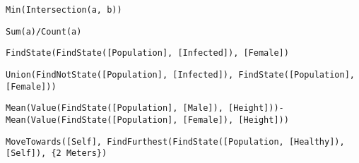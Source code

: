 \documentclass[]{memoir}
\begin{document}

\lstinline!Min(Intersection(a, b))!


\lstinline!Sum(a)/Count(a)!


\lstinline!FindState(FindState([Population], [Infected]), [Female])!


\lstinline!Union(FindNotState([Population], [Infected]), FindState([Population], [Female]))!


\lstinline!Mean(Value(FindState([Population], [Male]), [Height]))-Mean(Value(FindState([Population], [Female]), [Height]))!


\lstinline!MoveTowards([Self], FindFurthest(FindState([Population, [Healthy]), [Self]), {2 Meters})!

\end{document}
